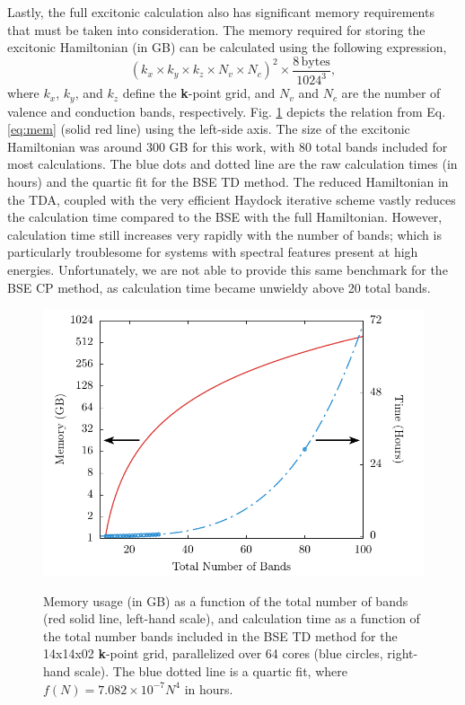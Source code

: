 \documentclass[aps,prb,10pt,superscriptaddress,notitlepage,endfloats]{revtex4-1}
\begin{document}
Lastly, the full excitonic calculation also has significant memory requirements
that must be taken into consideration. The memory required for storing the
excitonic Hamiltonian (in GB) can be calculated using the following expression,
\begin{equation}\label{eq:mem}
(k_{x}\times k_{y}\times k_{z}\times N_{v}\times N_{c})^{2} \times
\frac{8\, \mathrm{bytes}}{1024^{3}},
\end{equation}
where $k_{x}$, $k_{y}$, and $k_{z}$ define the \textbf{k}-point grid, and
$N_{v}$ and $N_{c}$ are the number of valence and conduction bands,
respectively. Fig. \ref{fig:bands} depicts the relation from Eq. \eqref{eq:mem}
(solid red line) using the left-side axis. The size of the excitonic Hamiltonian
was around 300 GB for this work, with 80 total bands included for most
calculations. The blue dots and dotted line are the raw calculation times (in
hours) and the quartic fit for the BSE TD method. The reduced Hamiltonian in the
TDA, coupled with the very efficient Haydock iterative scheme vastly reduces the
calculation time compared to the BSE with the full Hamiltonian. However,
calculation time still increases very rapidly with the number of bands; which is
particularly troublesome for systems with spectral features present at high
energies. Unfortunately, we are not able to provide this same benchmark for the
BSE CP method, as calculation time became unwieldy above 20 total bands.

\begin{figure}[t]
{\includegraphics[width=0.5\linewidth]{sup-fig05}}
\caption{Memory usage (in GB) as a function of the total number of
bands (red solid line, left-hand scale), and calculation time as a function of
the total number bands included in the BSE TD method for the 14x14x02
\textbf{k}-point grid, parallelized over 64 cores (blue circles, right-hand
scale). The blue dotted line is a quartic fit, where $f(N) =
7.082\times10^{-7}N^{4}$ in hours.}
\label{fig:bands}
\end{figure}
\end{document}
